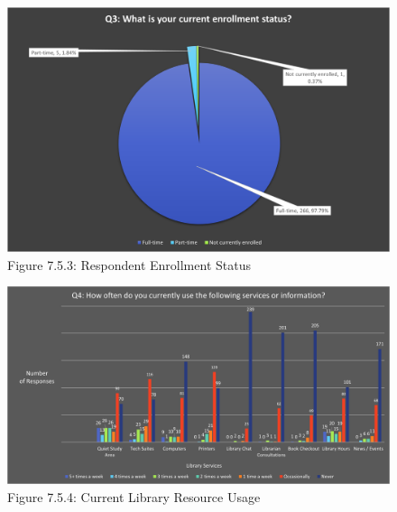        \newpage
     \begin{figure}[H]
        \centering
        \includegraphics[width = \textwidth, height = \textheight, keepaspectratio]{assets/img/Student Survey Results Q3.png}
        \caption*{Figure 7.5.3: Respondent Enrollment Status}
    \end{figure}
       \newpage
     \begin{figure}[H]
        \hspace*{-1.9cm}
        \includegraphics[scale = .7]{assets/img/Student Survey Results Q4.png}
         \caption*{Figure 7.5.4: Current Library Resource Usage}
    \end{figure}
       \newpage
